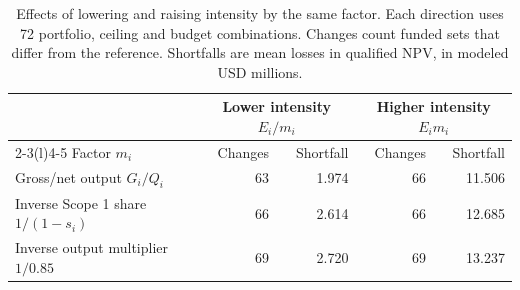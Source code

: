 \ifdefined\readingcopy\begin{table}[!t]\else\begin{table}[!ht]\fi\centering
\caption{Effects of lowering and raising intensity by the same factor. Each direction uses 72 portfolio, ceiling and budget combinations. Changes count funded sets that differ from the reference. Shortfalls are mean losses in qualified NPV, in modeled USD millions.}\label{tab:matched}
\footnotesize\begin{tabularx}{.98\linewidth}{@{}Xrrrr@{}}\toprule
 & \multicolumn{2}{c}{Lower intensity $E_i/m_i$} & \multicolumn{2}{c}{Higher intensity $E_i m_i$}\\
\cmidrule(lr){2-3}\cmidrule(l){4-5}
Factor $m_i$ & Changes & Shortfall & Changes & Shortfall\\\midrule
Gross/net output $G_i/Q_i$ &63&1.974&66&11.506\\
Inverse Scope 1 share $1/(1-s_i)$ &66&2.614&66&12.685\\
Inverse output multiplier $1/0.85$ &69&2.720&69&13.237\\\bottomrule
\end{tabularx}
\ifdefined\readingcopy\end{table}\else\end{table}\fi
